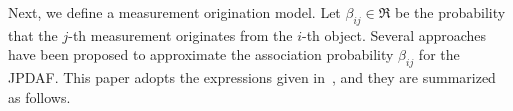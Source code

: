 


Next, we define a measurement origination model. Let $\beta_{ij}\in\Re$ be the probability that the $j$-th measurement originates from the $i$-th object. 
Several approaches have been proposed to approximate the association probability $\beta_{ij}$ for the JPDAF.
This paper adopts the expressions given in~\cite{Bar1990}, and they are summarized as follows.



